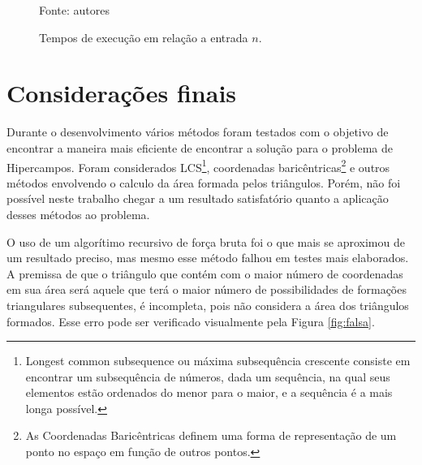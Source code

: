 \documentclass[12pt,a4paper]{article}
\begin{document}
\begin{figure}[!h]
	\caption{Tempos de execução em relação a entrada $n$.}
	\label{fig:tempos}
	\footnotesize \hphantom{spacessss}Fonte: autores
\end{figure}

\pagebreak

\section{Considerações finais}

Durante o desenvolvimento vários métodos foram testados com o objetivo de encontrar a maneira mais eficiente de encontrar a solução para o problema de Hipercampos. Foram considerados LCS\footnote{Longest common subsequence ou máxima subsequência crescente consiste em encontrar um subsequência de números, dada um sequência, na qual seus elementos estão ordenados  do menor para o maior, e a sequência é a mais longa possível.}, coordenadas baricêntricas\footnote{As Coordenadas Baricêntricas definem uma forma de representação de um ponto no espaço em função de outros pontos.} e outros métodos envolvendo o calculo da área formada pelos triângulos. Porém, não foi possível neste trabalho chegar a um resultado satisfatório quanto a aplicação desses métodos ao problema.

O uso de um algorítimo recursivo de força bruta foi o que mais se aproximou de um resultado preciso, mas mesmo esse método falhou em testes mais elaborados. A premissa de que o triângulo que contém com o maior número de coordenadas em sua área será aquele que terá o maior número de possibilidades de formações triangulares subsequentes, é incompleta, pois não considera a área dos triângulos formados. Esse erro pode ser verificado visualmente pela Figura \ref{fig:falsa}.
\end{document}

